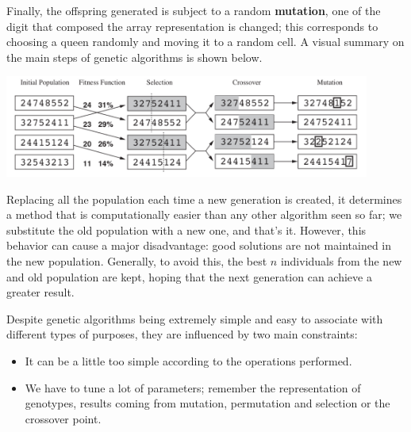 Finally, the offspring generated is subject to a random \textbf{mutation}, one of the digit that composed the array representation is changed; this corresponds to choosing a 
queen randomly and moving it to a random cell. A visual summary on the main steps of genetic algorithms is shown below. \vspace{3.5pt}
\begin{center}
    \includegraphics[width=0.9\textwidth]{img/img7.png}
\end{center} \vspace{3.5pt}

Replacing all the population each time a new generation is created, it determines a method that is computationally easier than any other algorithm seen so far; we substitute 
the old population with a new one, and that's it. However, this behavior can cause a major disadvantage: good solutions are not maintained in the new population. Generally, 
to avoid this, the best $n$ individuals from the new and old population are kept, hoping that the next generation can achieve a greater result. \vspace{3.5pt}

Despite genetic algorithms being extremely simple and easy to associate with different types of purposes, they are influenced by two main constraints:
\begin{itemize}
    \renewcommand{\labelitemi}{-}
    \item It can be a little too simple according to the operations performed.
    \item We have to tune a lot of parameters; remember the representation of genotypes, results coming from mutation, permutation and selection or the crossover point.
\end{itemize}